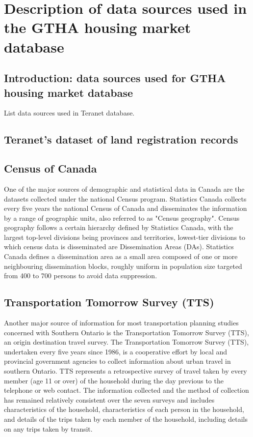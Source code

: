 \chapter{Description of data sources used in the GTHA housing market database} \label{ch:description_of_data_sources}

\section{Introduction: data sources used for GTHA housing market database} \label{sec:intro_data_sources}

List data sources used in Teranet database.

\section{Teranet's dataset of land registration records} \label{sec:teranet_description}


\section{Census of Canada} \label{sec:census_description}
One of the major sources of demographic and statistical data in Canada are the datasets collected under the national Census program.
Statistics Canada collects every five years the national Census of Canada and disseminates the information by a range of geographic units, also referred to as "Census geography"\cite{MapandDataLibrary2019}.
Census geography follows a certain hierarchy defined by Statistics Canada, with the largest top-level divisions being provinces and territories, lowest-tier divisions to which census data is disseminated are Dissemination Areas (DAs)\cite{StatisticsCanada2018}.
Statistics Canada defines a dissemination area as a small area composed of one or more neighbouring dissemination blocks, roughly uniform in population size targeted from 400 to 700 persons to avoid data suppression\cite{StatisticsCanada2015}.

\section{Transportation Tomorrow Survey (TTS)} \label{sec:tts_description}

Another major source of information for most transportation planning studies concerned with Southern Ontario is the Transportation Tomorrow Survey (TTS)\cite{DataManagementGroup2014}, an origin destination travel survey.
The Transportation Tomorrow Survey (TTS), undertaken every five years since 1986, is a cooperative effort by local and provincial government agencies to collect information about urban travel in southern Ontario.
TTS represents a retrospective survey of travel taken by every member (age 11 or over) of the household during the day previous to the telephone or web contact.
The information collected and the method of collection has remained relatively consistent over the seven surveys and includes characteristics of the household, characteristics of each person in the household, and details of the trips taken by each member of the household, including details on any trips taken by transit\cite{Ashby2018}.

